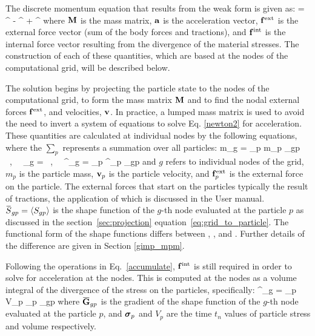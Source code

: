 The discrete momentum equation that results from the weak form is given as:
\Beq \label{newton2}
  \BMv \Ba = \Bf^{\Text} - \Bf^{\Tint}  + \Bf^{\Tbody}
\Eeq
where $\mathbf{M}$ is the mass matrix, $\mathbf{a}$ is the acceleration vector,
$\mathbf{f}^{\text{ext}}$ is the external force vector (sum of the body forces and
tractions), and $\mathbf{f}^{\text{int}}$ is the internal force vector resulting from
the divergence of the material stresses.  The construction of each of these
quantities, which are based at the nodes of the computational grid,
will be described below.

The solution begins by projecting the particle state to the
nodes of the computational grid, to form the mass matrix $\mathbf{M}$ and to find
the nodal external forces $\mathbf{f}^{\text{ext}}$, and velocities,
$\mathbf{v}$.  In practice, a lumped mass matrix is used to avoid the need to
invert a system of equations to solve Eq. \eqref{newton2} for acceleration.
These quantities are calculated at individual nodes by the following equations,
where the $\sum\limits_{p}$ represents a summation over all particles:
\Beq \label{accumulate}
  m_g = \sum_p m_p _{gp} ~,~~
  \Bv_g = ~,~~
  \Bf^{\Text}_g = \sum_p \Bf^{\Text}_p _{gp}
\Eeq
and $g$ refers to individual nodes of the grid, $m_p$ is the particle
mass, $\mathbf{v}_p$ is the particle velocity, and $\mathbf{f}^{\text{ext}}_p$ is the
external force on the particle.  The external forces that start on the
particles typically the result of tractions, the application of which is
discussed in the \Vaango User manual.
$\overbar{S}_{gp} = \Av{S_{gp}}$ is the shape function of the $g$-th node evaluated at
the particle $p$ as discussed in the section~\ref{sec:projection} equation~\eqref{eq:grid_to_particle}.
The functional form of the shape functions differs between \MPM, \GIMP, and \CPDI.
Further details of the difference are given in Section \ref{gimp_mpm}.

Following the operations in Eq.~\ref{accumulate}, $\mathbf{f}^{\text{int}}$
is still required in order to solve for acceleration at the nodes.
This is computed at the nodes as a volume integral of the divergence
of the stress on the particles, specifically:
\Beq \label{computeIntForce}  
  \Bf^{\Tint}_g = \sum_p V_p \Bsig_p \overbar{\BGv}_{gp}
\Eeq
where $\overbar{\BGv}_{gp}$ is the gradient of the shape function of the $g$-th node
evaluated at the particle $p$, and $\boldsymbol{\sigma}_p$ and $V_p$ are the time $t_n$ values of
particle stress and volume respectively.  

